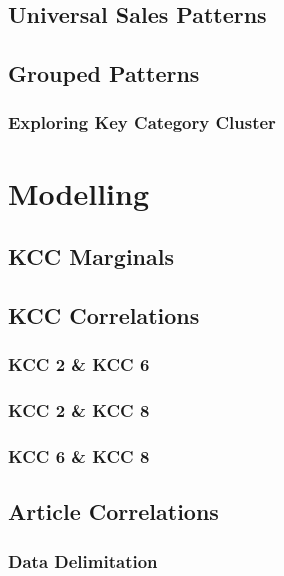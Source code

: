 \documentclass[11pt, twoside]{article}
\numberwithin{equation}{section}
\numberwithin{table}{section}
\numberwithin{figure}{section}
\begin{document}
\subsection{Universal Sales Patterns} \label{ssec:sales_patterns}

\subsection{Grouped Patterns} \label{ssec:grouped_patterns}

\subsubsection{Exploring Key Category Cluster} \label{sssec:kcc_exploration}

\newpage
\thispagestyle{empty}
\cleardoublepage

\thispagestyle{plain}
\section{Modelling} \label{sec:modelling}

\subsection{KCC Marginals} \label{ssec:kcc_marginals}

\subsection{KCC Correlations} \label{ssec:kcc_correlations}

\subsubsection{KCC 2 \& KCC 6} \label{sssec:kcc_26}

\subsubsection{KCC 2 \& KCC 8} \label{sssec:kcc_28}

\subsubsection{KCC 6 \& KCC 8} \label{sssec:kcc_68}

\subsection{Article Correlations} \label{ssec:article_correlations}

\subsubsection{Data Delimitation} \label{sssec:data_delimitation}

\newpage
\thispagestyle{empty}
\cleardoublepage
\end{document}
